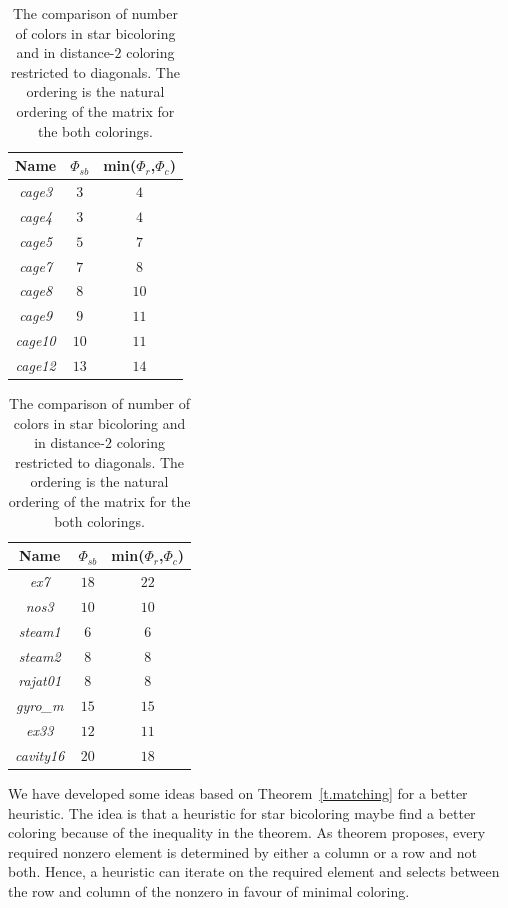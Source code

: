 \documentclass[12pt, twoside]{book}
\begin{document}
\begin{table}
\centering
\begin{tabular}{|c|c|c|}
\hline
Name & $\Phi_{sb}$ & min($\Phi_r$,$\Phi_c$)\\\hline
\textit{cage3} & $3$ & $4$\\\hline
\textit{cage4} & $3$ & $4$ \\\hline
\textit{cage5} & $5$ & $7$\\\hline
\textit{cage7} & $7$  & $8$\\\hline
\textit{cage8} & $8$  & $10$\\\hline
\textit{cage9} & $9$  & $11$\\\hline
\textit{cage10} & $10$ & $11$\\\hline
\textit{cage12} & $13$ &  $14$\\\hline
\end{tabular}

\begin{tabular}{|c|c|c|}
\hline
Name & $\Phi_{sb}$ & min($\Phi_r$,$\Phi_c$)\\\hline
\textit{ex7} & $18$ & $22$ \\\hline 
\textit{nos3} & $10$ & $10$ \\\hline
\textit{steam1} & $6$ & $6$ \\\hline
\textit{steam2} & $8$ & $8$ \\\hline
\textit{rajat01} & $8$ & $8$ \\\hline
\textit{gyro\_m} & $15$ & $15$\\\hline
\textit{ex33} & $12$ & $11$\\\hline
\textit{cavity16} & $20$ & $18$ \\\hline
\end{tabular}

\caption{The comparison of number of colors in star bicoloring and in
distance-$2$ coloring restricted to diagonals.
The ordering is the natural ordering of the matrix for the both colorings.
}
\label{table.starbic.d2.diag}
\end{table}

We have developed some ideas based on Theorem~\ref{t.matching}
for a better heuristic. The idea is that a heuristic for star bicoloring maybe
find a better coloring because of the inequality in the theorem.
As theorem proposes, every required nonzero element
is determined by either a column or a row and not both. Hence, a heuristic
can iterate on the required element and selects between the row and column of
the nonzero in favour of minimal coloring.
\end{document}
